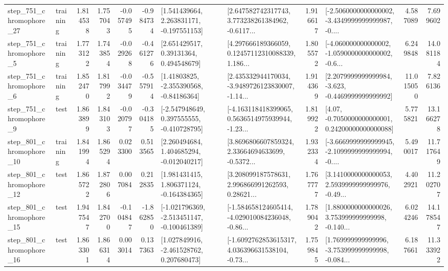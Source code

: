 \begin{tabular}{llrrrrllrlrr}
  step\_751\_chromophore\_27 &  training &      1.814538 &    1.757043 &     -0.057495 & -0.984734 &    [1.541439664, 2.263831171, -0.197551153] &  [2.647582742317743, 3.773238261384962, -0.6117... &       1.916617 &  [-2.5060000000000002, -3.4349999999999987, -0.... &            4.587089 &          7.699602 \\
   step\_751\_chromophore\_5 &  training &      1.773122 &    1.743854 &     -0.029268 & -0.461276 &      [2.651429517, 0.39131364, 0.494548679] &  [4.297666189366059, 0.12457112310088339, 1.186... &       1.805572 &  [-4.060000000000002, -1.0590000000000002, -0.6... &            6.249848 &         14.081184 \\
   step\_751\_chromophore\_6 &  training &      1.852470 &    1.817992 &     -0.034479 & -0.557914 &     [1.41803825, -2.355390568, -0.84186364] &  [2.435332944170034, -3.9489726123830007, -1.14... &       1.914369 &  [2.2079999999999984, -3.623, -0.4469999999999992] &           11.015050 &          7.826136 \\
   step\_751\_chromophore\_9 &      test &      1.863899 &    1.843103 &     -0.020797 & -0.304185 &   [-2.547948649, 0.397555555, -0.410728795] &  [-4.163118418399065, 0.5636514975939944, -1.23... &       1.819922 &   [4.07, -0.7050000000000001, 0.24200000000000088] &            5.775821 &         13.166278 \\
  step\_801\_chromophore\_10 &  training &      1.841994 &    1.865294 &      0.023300 &  0.513565 &    [2.260494684, 1.404685294, -0.012040217] &  [3.8696806607859324, 2.33664694633699, -0.5372... &       1.932334 &  [-3.6669999999999945, -2.1099999999999994, -0.... &            5.490017 &         11.717649 \\
  step\_801\_chromophore\_12 &      test &      1.865722 &    1.872806 &      0.007084 &  0.212835 &    [1.981431415, 1.806371124, -0.164384365] &  [3.208099187578631, 2.996866991262593, 0.28621... &       1.767777 &  [3.1410000000000053, 2.5939999999999976, -0.49... &            4.402921 &         11.202707 \\
  step\_801\_chromophore\_15 &      test &      1.947547 &    1.842700 &     -0.104847 & -1.862850 &  [-1.021796369, -2.513451147, -0.100461389] &  [-1.584658124605414, -4.029010084236048, -0.86... &       1.789042 &  [1.8800000000000026, 3.753999999999998, -0.140... &            6.024246 &         14.178547 \\
  step\_801\_chromophore\_16 &      test &      1.863301 &    1.866314 &      0.003014 &  0.137363 &    [1.027849916, -2.461528762, 0.207680473] &  [-1.6092762853615317, 4.036396631538104, -0.73... &       1.759845 &  [1.769999999999996, -3.753999999999998, -0.084... &            6.187661 &         11.333922 \\

\end{tabular}
